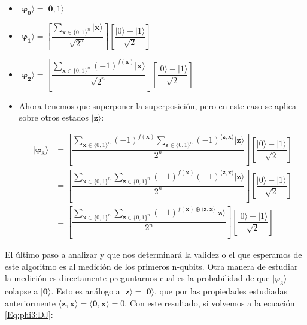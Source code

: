  \begin{itemize}
     \item $\mathbf{|\varphi_{0}\rangle} = |\mathbf{0},1\rangle$

    \vspace{5pt}

    \item  $\mathbf{|\varphi_{1}\rangle} = \left[ \dfrac{\sum_{\mathbf{x} \in \{0,1\}^{n}}|\mathbf{x}\rangle}{\sqrt{2^{n}}}\right] \left[ \dfrac{|0\rangle - |1\rangle}{\sqrt{2}}\right]$

    \vspace{5pt}

    \item $\mathbf{|\varphi_{2}\rangle} =\left[ \dfrac{\sum_{\mathbf{x} \in \{0,1\}^{n}}(-1)^{f(\mathbf{x})}|\mathbf{x}\rangle}{\sqrt{2^{n}}}\right] \left[ \dfrac{|0\rangle - |1\rangle}{\sqrt{2}}\right]$

    \vspace{5pt}

    \item Ahora tenemos que superponer la superposición, pero en este caso se aplica sobre otros estados $|\mathbf{z}\rangle$:

    \begin{equation}\label{Eq:phi3:DJ}
        \begin{split}\mathbf{|\varphi_{3}\rangle} &= \left[ \dfrac{\sum_{\mathbf{x} \in \{0,1\}^{n}}(-1)^{f(\mathbf{x})}\sum_{\mathbf{z} \in \{0,1\}^{n}}(-1)^{\langle\mathbf{z},\mathbf{x}\rangle}|\mathbf{z}\rangle}{2^{n}}\right] \left[ \dfrac{|0\rangle - |1\rangle}{\sqrt{2}}\right] \\ &= \left[ \dfrac{\sum_{\mathbf{x} \in \{0,1\}^{n}}\sum_{\mathbf{z} \in \{0,1\}^{n}}(-1)^{f(\mathbf{x})}(-1)^{\langle\mathbf{z},\mathbf{x}\rangle}|\mathbf{z}\rangle}{2^{n}}\right] \left[ \dfrac{|0\rangle - |1\rangle}{\sqrt{2}}\right] \\ &= \left[ \dfrac{\sum_{\mathbf{x} \in \{0,1\}^{n}}\sum_{\mathbf{z} \in \{0,1\}^{n}}(-1)^{f(\mathbf{x})\oplus\langle\mathbf{z},\mathbf{x}\rangle}|\mathbf{z}\rangle}{2^{n}}\right] \left[ \dfrac{|0\rangle - |1\rangle}{\sqrt{2}}\right]
        \end{split}
    \end{equation}
 \end{itemize}

 El último paso a analizar y que nos determinará la validez o el que esperamos de este algoritmo es al medición de los primeros n-qubits. Otra manera de estudiar la medición es directamente preguntarnos cual es la probabilidad de que $|\varphi_{3}\rangle$ colapse a $|\mathbf{0}\rangle$. Esto es análogo a $|\mathbf{z}\rangle=|\mathbf{0}\rangle$, que por las propiedades estudiadas anteriormente $\langle\mathbf{z},\mathbf{x}\rangle=\langle\mathbf{0},\mathbf{x}\rangle=0$. Con este resultado, si volvemos a la ecuación \ref{Eq:phi3:DJ}:

